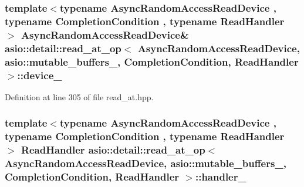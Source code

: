 \subsubsection[{device\+\_\+}]{\setlength{\rightskip}{0pt plus 5cm}template$<$typename Async\+Random\+Access\+Read\+Device , typename Completion\+Condition , typename Read\+Handler $>$ Async\+Random\+Access\+Read\+Device\& {\bf asio\+::detail\+::read\+\_\+at\+\_\+op}$<$ Async\+Random\+Access\+Read\+Device,                           {\bf asio\+::mutable\+\_\+buffers\+\_}, Completion\+Condition, Read\+Handler $>$\+::device\+\_\+}\label{classasio_1_1detail_1_1read__at__op_3_01_async_random_access_read_device_00_01_01_01_01_01_01_01ccd5681b695707fee491134502088d0f_a8904fc007449d739e945aabb04570824}


Definition at line 305 of file read\+\_\+at.\+hpp.

\hypertarget{classasio_1_1detail_1_1read__at__op_3_01_async_random_access_read_device_00_01_01_01_01_01_01_01ccd5681b695707fee491134502088d0f_af4dc43c4527cb81329def10f32a738d4}{}
\subsubsection[{handler\+\_\+}]{\setlength{\rightskip}{0pt plus 5cm}template$<$typename Async\+Random\+Access\+Read\+Device , typename Completion\+Condition , typename Read\+Handler $>$ Read\+Handler {\bf asio\+::detail\+::read\+\_\+at\+\_\+op}$<$ Async\+Random\+Access\+Read\+Device,                           {\bf asio\+::mutable\+\_\+buffers\+\_}, Completion\+Condition, Read\+Handler $>$\+::handler\+\_\+}\label{classasio_1_1detail_1_1read__at__op_3_01_async_random_access_read_device_00_01_01_01_01_01_01_01ccd5681b695707fee491134502088d0f_af4dc43c4527cb81329def10f32a738d4}


